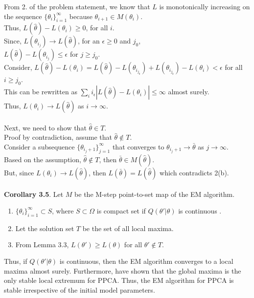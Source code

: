 From 2. of the problem statement, we know that $L$ is monotonically increasing on the sequence $\{ \theta_i\}_{i = 1}^{\infty}$ because $\theta_{i+1} \in M(\theta_i)$.\\
Thus, $L(\hat{\theta}) - L(\theta_i) \geq 0$, for all $i$. \\
Since, $L(\theta_{i_j}) \rightarrow L(\hat{\theta})$, for an $\epsilon \ge 0$ and $j_0$, \\
$L(\hat{\theta}) - L(\theta_{i_j}) \leq \epsilon$ for $j \geq j_0$. \\
Consider, $L(\hat{\theta}) - L(\theta_{i}) = L(\hat{\theta}) - L(\theta_{i_{j_0}}) + L(\theta_{i_{j_0}}) - L(\theta_{i}) < \epsilon$ for all $i \geq j_0$. \\
This can be rewritten as $\sum_{i}i_{\epsilon}|L(\hat{\theta}) - L(\theta_{i})| \le \infty$ almost surely. \\
Thus, $L(\theta_{i}) \rightarrow L(\hat{\theta})$ as $i \rightarrow \infty$. \\\\
Next, we need to show that $\hat{\theta} \in T$. \\
Proof by contradiction, assume that $\hat{\theta} \notin T$. \\
Consider a subsequence  $\{ \theta_{i_j+1}\}_{j = 1}^{\infty}$ that converges to $\theta_{i_j+1} \rightarrow \bar{\theta}$ as $j \rightarrow \infty$. \\
Based on the assumption, $\hat{\theta} \notin T$, then $\bar{\theta} \in M(\hat{\theta})$. \\
But, since $L(\theta_{i}) \rightarrow L(\hat{\theta})$, then $L(\bar{\theta}) = L(\hat{\theta})$ which contradicts 2(b).  \\\\

\textbf{Corollary 3.5}.  Let $M$ be the M-step point-to-set map of the EM algorithm. 
\begin{enumerate}
	\item $\{ \theta_i\}_{i = 1}^{\infty} \subset S$, where $S \subset \Omega$ is compact set if $Q(\theta'|\theta)$ is continuous \cite{wu1983convergence}. 
	\item Let the solution set $T$ be the set of all local maxima. 
	\item From Lemma 3.3, $L(\theta') \ge L(\theta)$ for all $\theta' \notin T$.
\end{enumerate}
Thus, if $Q(\theta'|\theta)$ is continuous, then the EM algorithm converges to a local maxima almost surely. Furthermore, \cite{tipping1999probabilistic} have shown that the global maxima is the only stable local extremum for PPCA. Thus, the EM algorithm for PPCA is stable irrespective of the initial model parameters. 


















